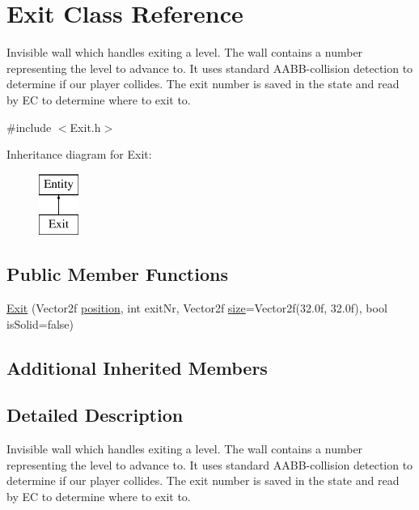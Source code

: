 \hypertarget{class_exit}{}\section{Exit Class Reference}
\label{class_exit}


Invisible wall which handles \textquotesingle{}exiting\textquotesingle{} a level. The wall contains a number representing the level to advance to. It uses standard A\+A\+B\+B-\/collision detection to determine if our player collides. The exit number is saved in the state and read by EC to determine where to exit to.  




{\ttfamily \#include $<$Exit.\+h$>$}

Inheritance diagram for Exit\+:\begin{figure}[H]
\begin{center}
\leavevmode
\includegraphics[height=2.000000cm]{class_exit}
\end{center}
\end{figure}
\subsection*{Public Member Functions}
\begin{DoxyCompactItemize}
\item 
\hyperlink{class_exit_ab98655fa93983e9b83175f68c35513de}{Exit} (Vector2f \hyperlink{class_entity_a6af9d6498134ad0906011778bc5736db}{position}, int exit\+Nr, Vector2f \hyperlink{class_entity_ae9a0a364c85f91ade5088b3610131417}{size}=Vector2f(32.\+0f, 32.\+0f), bool is\+Solid=false)
\end{DoxyCompactItemize}
\subsection*{Additional Inherited Members}


\subsection{Detailed Description}
Invisible wall which handles \textquotesingle{}exiting\textquotesingle{} a level. The wall contains a number representing the level to advance to. It uses standard A\+A\+B\+B-\/collision detection to determine if our player collides. The exit number is saved in the state and read by EC to determine where to exit to. 


